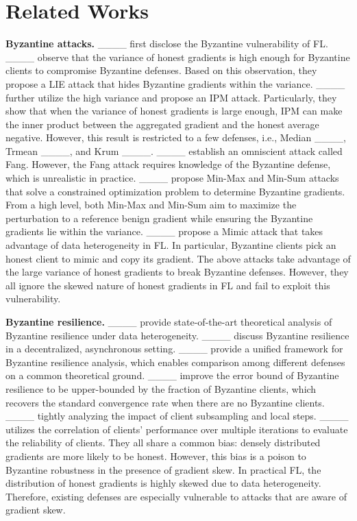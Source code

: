 \section{Related Works}
\textbf{Byzantine attacks.}
____ first disclose the Byzantine vulnerability of FL.
____ observe that the variance of honest gradients is high enough for Byzantine clients to compromise Byzantine defenses. 
Based on this observation, they propose a LIE attack that hides Byzantine gradients within the variance.
____ further utilize the high variance and propose an IPM attack.
Particularly, they show that when the variance of honest gradients is large enough, IPM can make the inner product between the aggregated gradient and the honest average negative.
However, this result is restricted to a few defenses, i.e., Median ____, Trmean ____, and Krum ____.
____ establish an omniscient attack called Fang.
However, the Fang attack requires knowledge of the Byzantine defense, which is unrealistic in practice.
____ propose Min-Max and Min-Sum attacks that solve a constrained optimization problem to determine Byzantine gradients.
From a high level, both Min-Max and Min-Sum aim to maximize the perturbation to a reference benign gradient while ensuring the Byzantine gradients lie within the variance.
____ propose a Mimic attack that takes advantage of data heterogeneity in FL.
In particular, Byzantine clients pick an honest client to mimic and copy its gradient.
The above attacks take advantage of the large variance of honest gradients to break Byzantine defenses.
However, they all ignore the skewed nature of honest gradients in FL and fail to exploit this vulnerability.

\textbf{Byzantine resilience.}
____ provide state-of-the-art theoretical analysis of Byzantine resilience under data heterogeneity.
____ discuss Byzantine resilience in a decentralized, asynchronous setting.
____ provide a unified framework for Byzantine resilience analysis, which enables comparison among different defenses on a common theoretical ground.
____ improve the error bound of Byzantine resilience to be upper-bounded by the fraction of Byzantine clients, which recovers the standard convergence rate when there are no Byzantine clients.
____ tightly analyzing the impact of client subsampling and local steps.
____ utilizes the correlation of clients’ performance over multiple iterations to evaluate the reliability of clients.
They all share a common bias: densely distributed gradients are more likely to be honest.
However, this bias is a poison to Byzantine robustness in the presence of gradient skew.
In practical FL, the distribution of honest gradients is highly skewed due to data heterogeneity.
Therefore, existing defenses are especially vulnerable to attacks that are aware of gradient skew.


